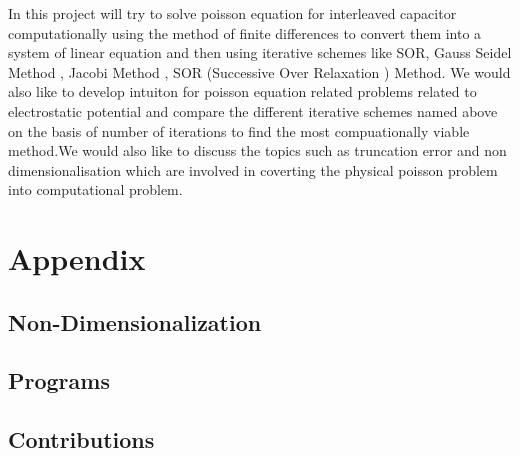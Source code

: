 \documentclass[12pt]{article}%
\numberwithin{equation}{section}
\begin{document}
\abstract{}

In this project will try to solve poisson equation for interleaved capacitor computationally using the method of finite differences to convert them into a system of linear equation and then using iterative schemes like SOR, Gauss Seidel Method , Jacobi Method , SOR (Successive Over Relaxation ) Method. We would also like to develop intuiton for poisson equation related problems related to electrostatic potential and compare the different iterative schemes named above on the basis of number of iterations to find the most compuationally viable method.We would also like to discuss the topics such as truncation error and non dimensionalisation which are involved in coverting the physical poisson  problem into computational problem.
\newpage
\tableofcontents
\newpage

\newpage

\newpage

\newpage


\newpage

\newpage
\section{Appendix}
    \subsection{Non-Dimensionalization}
    
    \subsection{Programs}
    \subsection{Contributions}
\end{document}
